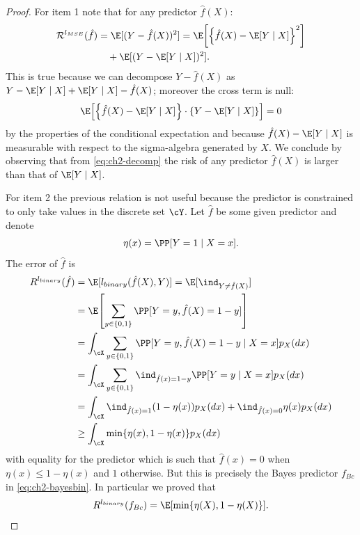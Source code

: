 \begin{proof}
For item 1 note that for any predictor $\hat{f}(X)$:
\begin{equation}\label{eq:ch2-decomp}
\begin{aligned}
\mathcal{R}^{l_{MSE}}(\hat{f}) &= \E[(Y - \hat{f}(X))^2] = \E\!\left[\left\{\hat{f}(X) - \E[Y \mid X]\right\}^2\right] \\
&\quad + \E[(Y - \E[Y \mid X])^2].
\end{aligned}
\end{equation}
This is true because we can decompose $Y - \hat{f}(X)$ as $Y - \E[Y \mid X] + \E[Y \mid X] - \hat{f}(X)$;
moreover the cross term is null:
\begin{equation}\label{eq:ch2-crossnull}
\E\!\left[\left\{\hat{f}(X) - \E[Y \mid X]\right\} \cdot \left\{Y - \E[Y \mid X]\right\}\right] = 0
\end{equation}
by the properties of the conditional expectation and because $\hat{f}(X) - \E[Y \mid X]$
is measurable with respect to the sigma-algebra generated by $X$. We conclude
by observing that from \eqref{eq:ch2-decomp} the risk of any predictor $\hat{f}(X)$ is larger
than that of $\E[Y \mid X]$.

For item 2 the previous relation is not useful because the predictor is constrained
to only take values in the discrete set $\cY$. Let $\hat{f}$ be some given
predictor and denote
\begin{equation}\label{eq:ch2-eta}
\eta(x) = \PP[Y = 1 \mid X = x].
\end{equation}
The error of $\hat{f}$ is
\begin{equation}\label{eq:ch2-binerror}
\begin{aligned}
R^{l_{binary}}(\hat{f}) &= \E[l_{binary}(\hat{f}(X), Y)] = \E[\ind_{Y \neq \hat{f}(X)}] \\
&= \E\!\left[\sum_{y \in \{0,1\}} \PP[Y = y, \hat{f}(X) = 1 - y]\right] \\
&= \int_{\cX} \sum_{y \in \{0,1\}} \PP[Y = y, \hat{f}(X) = 1 - y \mid X = x] p_X(dx) \\
&= \int_{\cX} \sum_{y \in \{0,1\}} \ind_{\hat{f}(x) = 1 - y} \PP[Y = y \mid X = x] p_X(dx) \\
&= \int_{\cX} \ind_{\hat{f}(x) = 1}(1 - \eta(x)) p_X(dx) + \ind_{\hat{f}(x) = 0}\eta(x) p_X(dx) \\
&\ge \int_{\cX} \min\{\eta(x), 1 - \eta(x)\} p_X(dx)
\end{aligned}
\end{equation}
with equality for the predictor which is such that $\hat{f}(x) = 0$ when $\eta(x) \le
1 - \eta(x)$ and $1$ otherwise. But this is precisely the Bayes predictor $f_{Bc}$ in
\eqref{eq:ch2-bayesbin}. In particular we proved that
\begin{equation}\label{eq:ch2-bayesbinrisk}
R^{l_{binary}}(f_{Bc}) = \E[\min\{\eta(X), 1 - \eta(X)\}].
\end{equation}
\end{proof}

